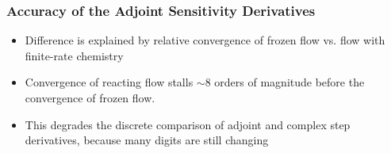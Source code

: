 \documentclass{beamer}
\begin{document}
\begin{frame}
  \frametitle{Accuracy of the Adjoint Sensitivity Derivatives}
  \begin{itemize}
    \item Difference is explained by relative convergence of frozen flow vs.
      flow with finite-rate chemistry
  \begin{figure}
    \centering
  \end{figure}
  \vspace{-0.2cm}
    \item Convergence of reacting flow stalls $\sim 8$ orders of magnitude
      before the convergence of frozen flow.
    \item This degrades the discrete comparison of adjoint and complex step
      derivatives, because many digits are still changing
  \end{itemize}
\end{frame}
\end{document}
